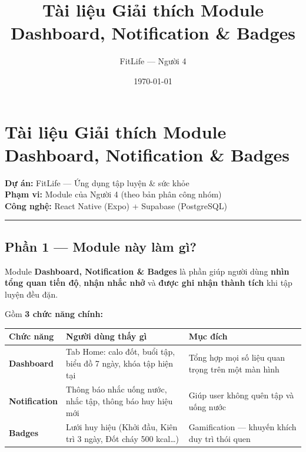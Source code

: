 \documentclass[12pt,a4paper]{article}
\title{Tài liệu Giải thích Module Dashboard, Notification \& Badges}
\author{FitLife --- Người 4}
\date{\today}
\begin{document}
\maketitle
\tableofcontents
\newpage

\section{Tài liệu Giải thích Module Dashboard, Notification \&
Badges}\label{tuxe0i-liux1ec7u-giux1ea3i-thuxedch-module-dashboard-notification-badges}

\textbf{Dự án:} FitLife --- Ứng dụng tập luyện \& sức khỏe\\
\textbf{Phạm vi:} Module của Người 4 (theo bản phân công nhóm)\\
\textbf{Công nghệ:} React Native (Expo) + Supabase (PostgreSQL)

\begin{center}\rule{0.5\linewidth}{0.5pt}\end{center}

\subsection{Phần 1 --- Module này làm
gì?}\label{phux1ea7n-1-module-nuxe0y-luxe0m-guxec}

Module \textbf{Dashboard, Notification \& Badges} là phần giúp người
dùng \textbf{nhìn tổng quan tiến độ}, \textbf{nhận nhắc nhở} và
\textbf{được ghi nhận thành tích} khi tập luyện đều đặn.

Gồm \textbf{3 chức năng chính:}

{\def\LTcaptype{none} %
\begin{longtable}[]{@{}
  >{\raggedright\arraybackslash}p{}
  >{\raggedright\arraybackslash}p{}
  >{\raggedright\arraybackslash}p{}@{}}
\toprule\noalign{}
\begin{minipage}[b]{\linewidth}\raggedright
Chức năng
\end{minipage} & \begin{minipage}[b]{\linewidth}\raggedright
Người dùng thấy gì
\end{minipage} & \begin{minipage}[b]{\linewidth}\raggedright
Mục đích
\end{minipage} \\
\midrule\noalign{}
\endhead
\bottomrule\noalign{}
\endlastfoot
\textbf{Dashboard} & Tab Home: calo đốt, buổi tập, biểu đồ 7 ngày, khóa
tập hiện tại & Tổng hợp mọi số liệu quan trọng trên một màn hình \\
\textbf{Notification} & Thông báo nhắc uống nước, nhắc tập, thông báo
huy hiệu mới & Giúp user không quên tập và uống nước \\
\textbf{Badges} & Lưới huy hiệu (Khởi đầu, Kiên trì 3 ngày, Đốt cháy 500
kcal\ldots) & Gamification --- khuyến khích duy trì thói quen \\
\end{longtable}
}
\end{document}
